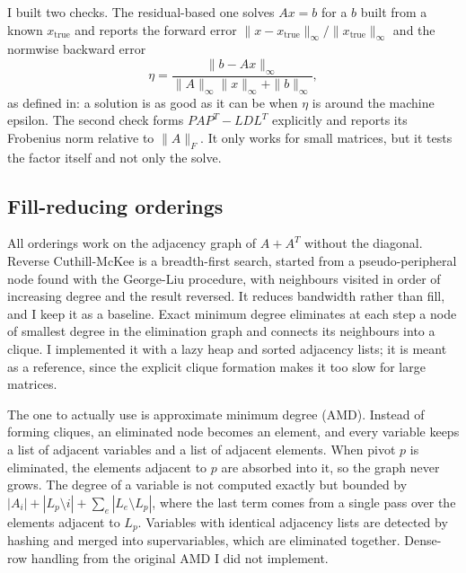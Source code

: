 \documentclass[conference]{IEEEtran}
\begin{document}
I built two checks. The residual-based one solves $Ax=b$ for a $b$ built from a known $x_{\mathrm{true}}$ and reports the forward error $\|x-x_{\mathrm{true}}\|_\infty/\|x_{\mathrm{true}}\|_\infty$ and the normwise backward error
\begin{equation}
\eta = \frac{\|b-Ax\|_\infty}{\|A\|_\infty\|x\|_\infty+\|b\|_\infty},\label{eq:bwd}
\end{equation}
as defined in\cite{b8}: a solution is as good as it can be when $\eta$ is around the machine epsilon. The second check forms $PAP^T-LDL^T$ explicitly and reports its Frobenius norm relative to $\|A\|_F$. It only works for small matrices, but it tests the factor itself and not only the solve.

\subsection{Fill-reducing orderings}
All orderings work on the adjacency graph of $A+A^T$ without the diagonal. Reverse Cuthill-McKee\cite{b4} is a breadth-first search, started from a pseudo-peripheral node found with the George-Liu procedure\cite{b6}, with neighbours visited in order of increasing degree and the result reversed. It reduces bandwidth rather than fill, and I keep it as a baseline. Exact minimum degree eliminates at each step a node of smallest degree in the elimination graph and connects its neighbours into a clique. I implemented it with a lazy heap and sorted adjacency lists; it is meant as a reference, since the explicit clique formation makes it too slow for large matrices.

The one to actually use is approximate minimum degree (AMD)\cite{b3}. Instead of forming cliques, an eliminated node becomes an element, and every variable keeps a list of adjacent variables and a list of adjacent elements. When pivot $p$ is eliminated, the elements adjacent to $p$ are absorbed into it, so the graph never grows. The degree of a variable is not computed exactly but bounded by $|A_i|+|L_p\setminus i|+\sum_e |L_e\setminus L_p|$, where the last term comes from a single pass over the elements adjacent to $L_p$. Variables with identical adjacency lists are detected by hashing and merged into supervariables, which are eliminated together. Dense-row handling from the original AMD I did not implement.
\end{document}
